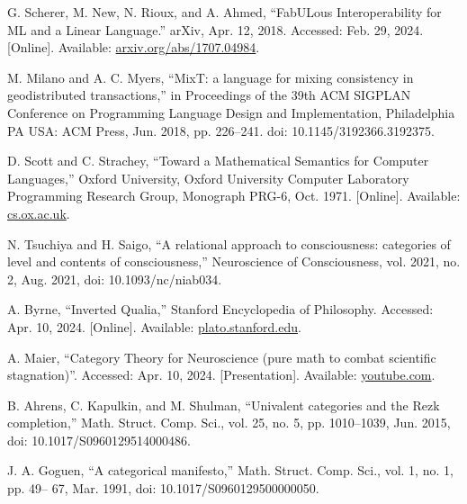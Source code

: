 \documentclass{article}
\begin{document}
\begin{thebibliography}{99}
    G. Scherer, M. New, N. Rioux, and A. Ahmed, “FabULous Interoperability for ML and a
    Linear Language.” arXiv, Apr. 12, 2018. Accessed: Feb. 29, 2024. [Online]. Available: \href{http://arxiv.org/abs/1707.04984}{arxiv.org/abs/1707.04984}.

    M. Milano and A. C. Myers, “MixT: a language for mixing consistency in geodistributed
    transactions,” in Proceedings of the 39th ACM SIGPLAN Conference on Programming
    Language Design and Implementation, Philadelphia PA USA: ACM Press, Jun. 2018, pp.
    226–241. doi: 10.1145/3192366.3192375.

    D. Scott and C. Strachey, “Toward a Mathematical Semantics for Computer Languages,”
    Oxford University, Oxford University Computer Laboratory Programming Research
    Group, Monograph PRG-6, Oct. 1971. [Online]. Available: \href{https://www.cs.ox.ac.uk/publications/publication3723-abstract.html}{cs.ox.ac.uk}.

    N. Tsuchiya and H. Saigo, “A relational approach to consciousness: categories of level
    and contents of consciousness,” Neuroscience of Consciousness, vol. 2021, no. 2, Aug.
    2021, doi: 10.1093/nc/niab034.

    A. Byrne, “Inverted Qualia,” Stanford Encyclopedia of Philosophy. Accessed: Apr. 10,
    2024. [Online]. Available: \href{https://plato.stanford.edu/entries/qualia-inverted/}{plato.stanford.edu}.

    A. Maier, “Category Theory for Neuroscience (pure math to combat scientific
    stagnation)”. Accessed: Apr. 10, 2024. [Presentation]. Available: \href{https://www.youtube.com/watch?v=4GJ4UQZvCNM}{youtube.com}.

    B. Ahrens, C. Kapulkin, and M. Shulman, “Univalent categories and the Rezk
    completion,” Math. Struct. Comp. Sci., vol. 25, no. 5, pp. 1010–1039, Jun. 2015, doi:
    10.1017/S0960129514000486.

    J. A. Goguen, “A categorical manifesto,” Math. Struct. Comp. Sci., vol. 1, no. 1, pp. 49–
    67, Mar. 1991, doi: 10.1017/S0960129500000050.

\end{thebibliography}
\end{document}
